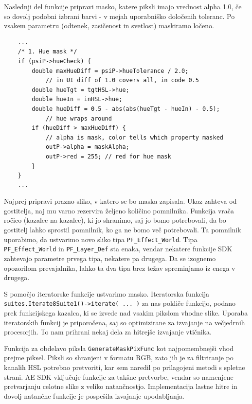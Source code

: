 \documentclass[a4paper, 12pt]{book}
\begin{document}
Naslednji del funkcije pripravi masko, katere piksli imajo vrednost alpha 1.0, če so dovolj podobni izbrani barvi - v mejah uporabniško določenih toleranc.
Po vsakem parametru (odtenek, zasičenost in svetlost) maskiramo ločeno.

\begin{verbatim}
    ...
    /* 1. Hue mask */
    if (psiP->hueCheck) {
        double maxHueDiff = psiP->hueTolerance / 2.0; 
            // in UI diff of 1.0 covers all, in code 0.5
        double hueTgt = tgtHSL->hue;
        double hueIn = inHSL->hue;
        double hueDiff = 0.5 - abs(abs(hueTgt - hueIn) - 0.5); 
            // hue wraps around
        if (hueDiff > maxHueDiff) {
            // alpha is mask, color tells which property masked
            outP->alpha = maskAlpha;
            outP->red = 255; // red for hue mask
        }
    }
    ...
\end{verbatim}

Najprej pripravi prazno sliko, v katero se bo maska zapisala.
Ukaz  zahteva od gostitelja, naj mu varno rezervira željeno količino pomnilnika.
Funkcija vrača ročico (kazalec na kazalec), ki jo shranimo, saj jo bomo potrebovali, da bo gostitelj lahko sprostil pomnilnik, ko ga ne bomo več potrebovali.
Ta pomnilnik uporabimo, da ustvarimo novo sliko tipa \verb!PF_Effect_World!.
Tipa \verb!PF_Effect_World! in \verb!PF_Layer_Def! sta enaka, vendar nekatere funkcije SDK zahtevajo parametre prvega tipa, nekatere pa drugega.
Da se izognemo opozorilom prevajalnika, lahko ta dva tipa brez težav spreminjamo iz enega v drugega.

S pomočjo iteratorske funkcije ustvarimo masko.
Iteratorska funkcija \verb!suites.Iterate8Suite1()->iterate( ... )! za nas pokliče funkcijo, podano prek funkcijskega kazalca, ki se izvede nad vsakim pikslom vhodne slike.
Uporaba iteratorskih funkcij je priporočena, saj so optimizirane za izvajanje na  večjedrnih procesorjih.
To nam prihrani nekaj dela za hitrejše izvajanje vtičnika.

Funkcija za obdelavo piksla \texttt{GenerateMaskPixFunc} kot najpomembnejši vhod prejme piksel.
Piksli so shranjeni v formatu RGB, zato jih je za filtriranje po kanalih HSL potrebno pretvoriti, kar sem naredil po prilagojeni metodi s spletne strani\cite{rgbhsl}.
AE SDK vključuje funkcije za takšne pretvorbe, vendar so namenjene pretvarjanju celotne slike z veliko natančnostjo.
Implementacija lastne hitre in dovolj natančne funkcije je pospešila izvajanje upodabljanja.
\end{document}
